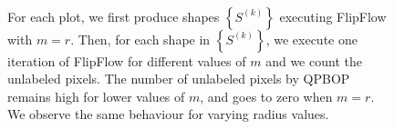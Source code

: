 {\begin{figure}
\begin{minipage}[b]{0.5\textwidth}
\\%
%
\end{minipage}
\caption{For each plot, we first produce shapes $\left\{ S^{(k)} \right\}$ executing FlipFlow with $m=r$. Then, for each shape in $\left\{ S^{(k)} \right\}$, we execute one iteration of FlipFlow for different values of $m$ and we count the unlabeled pixels. The number of unlabeled pixels by QPBOP remains high for lower values of $m$, and goes to zero when $m=r$. We observe the same behaviour for varying radius values.}
\label{fig:unlabeled-versus-iterations}
\end{figure}



}
